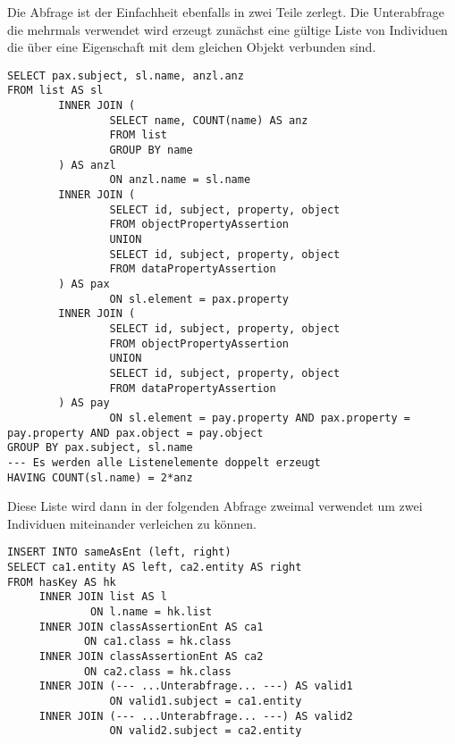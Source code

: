 Die Abfrage ist der Einfachheit ebenfalls in zwei Teile zerlegt. Die Unterabfrage die mehrmals verwendet wird erzeugt zunächst eine gültige Liste von Individuen die über eine Eigenschaft mit dem gleichen Objekt verbunden sind.
\begin{lstlisting}
SELECT pax.subject, sl.name, anzl.anz
FROM list AS sl
        INNER JOIN (
                SELECT name, COUNT(name) AS anz
                FROM list
                GROUP BY name
        ) AS anzl
                ON anzl.name = sl.name
        INNER JOIN (
                SELECT id, subject, property, object
                FROM objectPropertyAssertion
                UNION
                SELECT id, subject, property, object
                FROM dataPropertyAssertion
        ) AS pax
                ON sl.element = pax.property
        INNER JOIN (
                SELECT id, subject, property, object
                FROM objectPropertyAssertion
                UNION
                SELECT id, subject, property, object
                FROM dataPropertyAssertion
        ) AS pay
                ON sl.element = pay.property AND pax.property = pay.property AND pax.object = pay.object
GROUP BY pax.subject, sl.name
--- Es werden alle Listenelemente doppelt erzeugt
HAVING COUNT(sl.name) = 2*anz
\end{lstlisting}

Diese Liste wird dann in der folgenden Abfrage zweimal verwendet um zwei Individuen miteinander verleichen zu können.
\begin{lstlisting}
INSERT INTO sameAsEnt (left, right)
SELECT ca1.entity AS left, ca2.entity AS right
FROM hasKey AS hk
     INNER JOIN list AS l
             ON l.name = hk.list
     INNER JOIN classAssertionEnt AS ca1
            ON ca1.class = hk.class
     INNER JOIN classAssertionEnt AS ca2
            ON ca2.class = hk.class
     INNER JOIN (--- ...Unterabfrage... ---) AS valid1
                ON valid1.subject = ca1.entity
     INNER JOIN (--- ...Unterabfrage... ---) AS valid2
                ON valid2.subject = ca2.entity
\end{lstlisting}